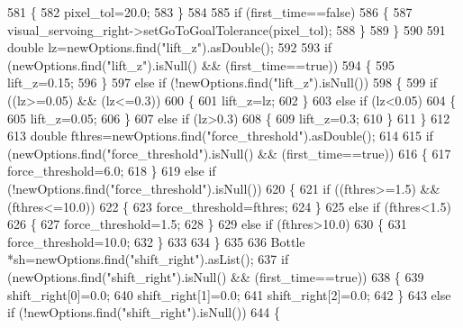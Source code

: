 \begin{DoxyCode}
581         \{
582             pixel_tol=20.0;
583         \}
584 
585         \textcolor{keywordflow}{if} (first\_time==\textcolor{keyword}{false})
586         \{
587             visual_servoing_right->setGoToGoalTolerance(pixel_tol);
588         \}
589     \}
590 
591     \textcolor{keywordtype}{double} lz=newOptions.find(\textcolor{stringliteral}{"lift\_z"}).asDouble();
592 
593     \textcolor{keywordflow}{if} (newOptions.find(\textcolor{stringliteral}{"lift\_z"}).isNull() && (first\_time==\textcolor{keyword}{true}))
594     \{
595         lift\_z=0.15;
596     \}
597     \textcolor{keywordflow}{else} \textcolor{keywordflow}{if} (!newOptions.find(\textcolor{stringliteral}{"lift\_z"}).isNull())
598     \{
599         \textcolor{keywordflow}{if} ((lz>=0.05) && (lz<=0.3))
600         \{
601             lift\_z=lz;
602         \}
603         \textcolor{keywordflow}{else} \textcolor{keywordflow}{if} (lz<0.05)
604         \{
605             lift\_z=0.05;
606         \}       
607         \textcolor{keywordflow}{else} \textcolor{keywordflow}{if} (lz>0.3)
608         \{
609             lift\_z=0.3;
610         \}
611     \}
612 
613     \textcolor{keywordtype}{double} fthres=newOptions.find(\textcolor{stringliteral}{"force\_threshold"}).asDouble();
614 
615     \textcolor{keywordflow}{if} (newOptions.find(\textcolor{stringliteral}{"force\_threshold"}).isNull() && (first\_time==\textcolor{keyword}{true}))
616     \{
617         force\_threshold=6.0;
618     \}
619     \textcolor{keywordflow}{else} \textcolor{keywordflow}{if} (!newOptions.find(\textcolor{stringliteral}{"force\_threshold"}).isNull())
620     \{
621         \textcolor{keywordflow}{if} ((fthres>=1.5) && (fthres<=10.0))
622         \{
623             force\_threshold=fthres;
624         \}
625         \textcolor{keywordflow}{else} \textcolor{keywordflow}{if} (fthres<1.5)
626         \{
627             force\_threshold=1.5;
628         \}
629         \textcolor{keywordflow}{else} \textcolor{keywordflow}{if} (fthres>10.0)
630         \{
631             force\_threshold=10.0;
632         \}
633 
634     \}
635 
636     Bottle *sh=newOptions.find(\textcolor{stringliteral}{"shift\_right"}).asList();
637     \textcolor{keywordflow}{if} (newOptions.find(\textcolor{stringliteral}{"shift\_right"}).isNull() && (first\_time==\textcolor{keyword}{true}))
638     \{
639         shift\_right[0]=0.0;
640         shift\_right[1]=0.0;
641         shift\_right[2]=0.0;
642     \}
643     \textcolor{keywordflow}{else} \textcolor{keywordflow}{if} (!newOptions.find(\textcolor{stringliteral}{"shift\_right"}).isNull())
644     \{

\end{DoxyCode}
